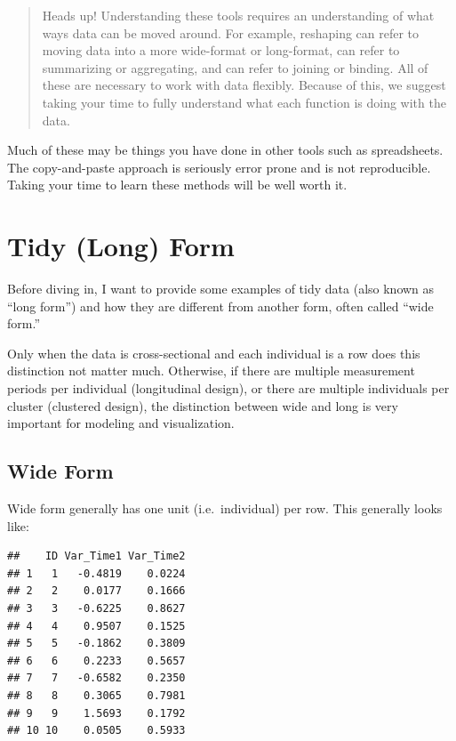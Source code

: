 \documentclass[]{tufte-book}
\theoremstyle{definition}
\theoremstyle{definition}
\theoremstyle{remark}
\begin{document}
\begin{quote}
Heads up! Understanding these tools requires an understanding of what
ways data can be moved around. For example, reshaping can refer to
moving data into a more wide-format or long-format, can refer to
summarizing or aggregating, and can refer to joining or binding. All of
these are necessary to work with data flexibly. Because of this, we
suggest taking your time to fully understand what each function is doing
with the data.
\end{quote}

Much of these may be things you have done in other tools such as
spreadsheets. The copy-and-paste approach is seriously error prone and
is not reproducible. Taking your time to learn these methods will be
well worth it.

\section*{Tidy (Long) Form}\label{tidy-long-form}

Before diving in, I want to provide some examples of tidy data (also
known as ``long form'') and how they are different from another form,
often called ``wide form.''

Only when the data is cross-sectional and each individual is a row does
this distinction not matter much. Otherwise, if there are multiple
measurement periods per individual (longitudinal design), or there are
multiple individuals per cluster (clustered design), the distinction
between wide and long is very important for modeling and visualization.

\subsection*{Wide Form}\label{wide-form}

Wide form generally has one unit (i.e.~individual) per row. This
generally looks like:

\begin{verbatim}
##    ID Var_Time1 Var_Time2
## 1   1   -0.4819    0.0224
## 2   2    0.0177    0.1666
## 3   3   -0.6225    0.8627
## 4   4    0.9507    0.1525
## 5   5   -0.1862    0.3809
## 6   6    0.2233    0.5657
## 7   7   -0.6582    0.2350
## 8   8    0.3065    0.7981
## 9   9    1.5693    0.1792
## 10 10    0.0505    0.5933
\end{verbatim}
\end{document}
